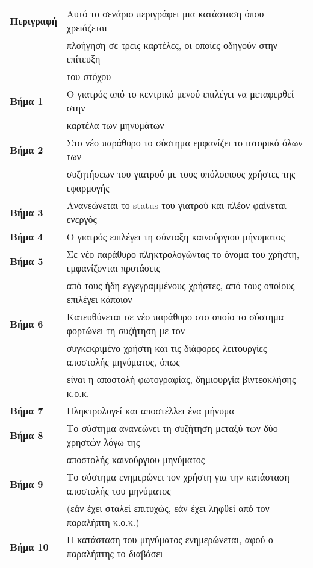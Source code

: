 \documentclass{article}
\newcommand\T{\rule{0pt}{2.6ex}}       %
\newcommand\B{\rule[-1.2ex]{0pt}{0pt}}
\begin{document}
 \begin{center}
     \begin{tabular}{|l|l|}
     \hline
      \textbf{Περιγραφή} & Αυτό το σενάριο περιγράφει μια κατάσταση όπου χρειάζεται \T \\& πλοήγηση σε τρεις καρτέλες, οι οποίες οδηγούν στην επίτευξη \\& του στόχου \B \\ 
      \hline
      \textbf{Βήμα 1} & Ο γιατρός από το κεντρικό μενού επιλέγει να μεταφερθεί στην \T \\& καρτέλα των μηνυμάτων \B \\
      \hline
      \textbf{Βήμα 2} & Στο νέο παράθυρο το σύστημα εμφανίζει το ιστορικό όλων των \T \\& συζητήσεων του γιατρού με τους υπόλοιπους χρήστες της εφαρμογής \B \\
      \hline
      \textbf{Βήμα 3} & Ανανεώνεται το status του γιατρού και πλέον φαίνεται ενεργός \T\B \\
      \hline
      \textbf{Βήμα 4} & Ο γιατρός επιλέγει τη σύνταξη καινούργιου μήνυματος \T\B \\
      \hline
      \textbf{Βήμα 5} & Σε νέο παράθυρο πληκτρολογώντας το όνομα του χρήστη, εμφανίζονται προτάσεις \T \\& από τους ήδη εγγεγραμμένους χρήστες, από τους οποίους επιλέγει κάποιον  \B \\
      \hline
      \textbf{Βήμα 6} & Κατευθύνεται σε νέο παράθυρο στο οποίο το σύστημα φορτώνει τη συζήτηση με τον \T \\& συγκεκριμένο χρήστη και τις διάφορες λειτουργίες αποστολής μηνύματος, όπως \\& είναι η αποστολή φωτογραφίας, δημιουργία βιντεοκλήσης κ.ο.κ.  \B \\
      \hline
      \textbf{Βήμα 7} & Πληκτρολογεί και αποστέλλει ένα μήνυμα \T\B \\
      \hline
      \textbf{Βήμα 8} & Το σύστημα ανανεώνει τη συζήτηση μεταξύ των δύο χρηστών λόγω της \T \\& αποστολής καινούργιου μηνύματος \B \\
      \hline
      \textbf{Βήμα 9} & Το σύστημα ενημερώνει τον χρήστη για την κατάσταση αποστολής του μηνύματος \T \\& (εάν έχει σταλεί επιτυχώς, εάν έχει ληφθεί από τον παραλήπτη κ.ο.κ.) \B \\
      \hline
      \textbf{Βήμα 10} & Η κατάσταση του μηνύματος ενημερώνεται, αφού ο παραλήπτης το διαβάσει \T\B \\
      \hline
     \end{tabular}
 \end{center}
 
\end{document}
